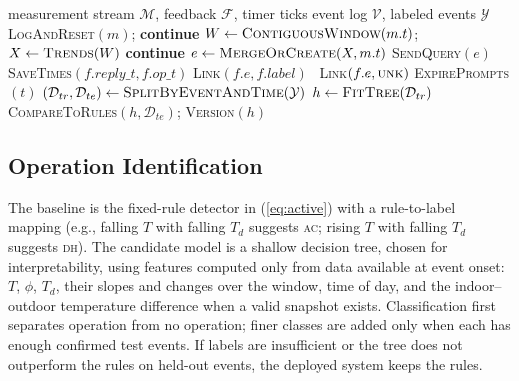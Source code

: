 \documentclass[conference]{IEEEtran}
\begin{document}
\begin{algorithm}[t]
\caption{Event Monitoring and Feedback}
\label{alg:event}
\small
\begin{algorithmic}[1]
\Require measurement stream $\mathcal{M}$, feedback $\mathcal{F}$, timer ticks
\Ensure event log $\mathcal{V}$, labeled events $\mathcal{Y}$
   \textsc{LogAndReset}$(m)$; \textbf{continue} \EndIf
  \State $W\gets\textsc{ContiguousWindow}(m.t)$; $X\gets\textsc{Trends}(W)$
   \textbf{continue} \EndIf
  \State $e\gets\textsc{MergeOrCreate}(X,m.t)$
   \textsc{SendQuery}$(e)$ \EndIf
\EndFor
{}
  \State \textsc{SaveTimes}$(f.\mathit{reply\_t}, f.\mathit{op\_t})$
   \textsc{Link}$(f.e, f.\mathit{label})$
  \Else\ \textsc{Link}$(f.e, \textsc{unk})$ \EndIf
\EndFor
{}
  \State \textsc{ExpirePrompts}$(t)$ 
    \State $(\mathcal{D}_{tr},\mathcal{D}_{te})\gets\textsc{SplitByEventAndTime}(\mathcal{Y})$
    \State $h\gets\textsc{FitTree}(\mathcal{D}_{tr})$ 
    \State \textsc{CompareToRules}$(h,\mathcal{D}_{te})$; \textsc{Version}$(h)$
  \EndIf
\EndFor
\end{algorithmic}
\end{algorithm}

\subsection{Operation Identification}
The baseline is the fixed-rule detector in (\ref{eq:active}) with a rule-to-label mapping (e.g., falling $T$ with falling $T_d$ suggests \textsc{ac}; rising $T$ with falling $T_d$ suggests \textsc{dh}). The candidate model is a shallow decision tree, chosen for interpretability, using features computed only from data available at event onset: $T$, $\phi$, $T_d$, their slopes and changes over the window, time of day, and the indoor--outdoor temperature difference when a valid snapshot exists. Classification first separates operation from no operation; finer classes are added only when each has enough confirmed test events. If labels are insufficient or the tree does not outperform the rules on held-out events, the deployed system keeps the rules.

\end{document}
